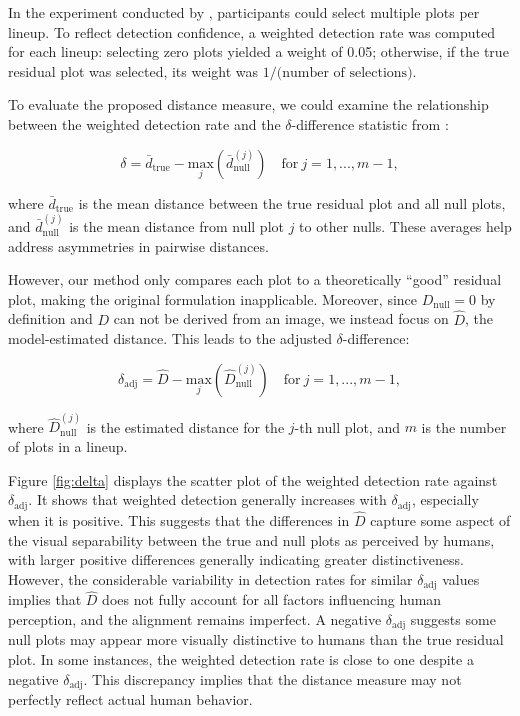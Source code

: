 \documentclass[]{interact}
\theoremstyle{plain}%
\theoremstyle{definition}
\theoremstyle{remark}
\begin{document}
In the experiment conducted by \citet{li2024plot}, participants could
select multiple plots per lineup. To reflect detection confidence, a
weighted detection rate was computed for each lineup: selecting zero
plots yielded a weight of 0.05; otherwise, if the true residual plot was
selected, its weight was \(1 / \text{(number of selections)}\).

To evaluate the proposed distance measure, we could examine the
relationship between the weighted detection rate and the
\(\delta\)-difference statistic from \citet{chowdhury2018measuring}:

\[
\delta = \bar{d}_{\text{true}} - \underset{j}{\text{max}}\left(\bar{d}_{\text{null}}^{(j)}\right) \quad \text{for}~j = 1,...,m-1,
\]

\noindent where \(\bar{d}_{\text{true}}\) is the mean distance between
the true residual plot and all null plots, and
\(\bar{d}_{\text{null}}^{(j)}\) is the mean distance from null plot
\(j\) to other nulls. These averages help address asymmetries in
pairwise distances.

However, our method only compares each plot to a theoretically ``good''
residual plot, making the original formulation inapplicable. Moreover,
since \(D_{\text{null}} = 0\) by definition and \(D\) can not be derived
from an image, we instead focus on \(\hat{D}\), the model-estimated
distance. This leads to the adjusted \(\delta\)-difference:

\[
\delta_{\text{adj}} = \hat{D} - \underset{j}{\text{max}}\left(\hat{D}_{\text{null}}^{(j)}\right) \quad \text{for}~j = 1,...,m-1,
\]

\noindent where \(\hat{D}_{\text{null}}^{(j)}\) is the estimated
distance for the \(j\)-th null plot, and \(m\) is the number of plots in
a lineup.

Figure \ref{fig:delta} displays the scatter plot of the weighted
detection rate against \(\delta_{\text{adj}}\). It shows that weighted
detection generally increases with \(\delta_{\text{adj}}\), especially
when it is positive. This suggests that the differences in \(\hat{D}\)
capture some aspect of the visual separability between the true and null
plots as perceived by humans, with larger positive differences generally
indicating greater distinctiveness. However, the considerable
variability in detection rates for similar \(\delta_{\text{adj}}\)
values implies that \(\hat{D}\) does not fully account for all factors
influencing human perception, and the alignment remains imperfect. A
negative \(\delta_{\text{adj}}\) suggests some null plots may appear
more visually distinctive to humans than the true residual plot. In some
instances, the weighted detection rate is close to one despite a
negative \(\delta_{\text{adj}}\). This discrepancy implies that the
distance measure may not perfectly reflect actual human behavior.
\end{document}
